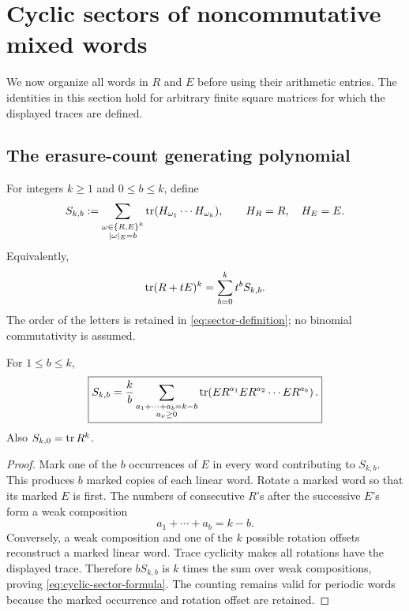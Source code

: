 \section{Cyclic sectors of noncommutative mixed words}
\label{sec:mixed-words}

We now organize all words in \(R\) and \(E\) before using their arithmetic
entries.  The identities in this section hold for arbitrary finite square
matrices for which the displayed traces are defined.

\subsection{The erasure-count generating polynomial}

For integers \(k\ge1\) and \(0\le b\le k\), define
\begin{equation}
 S_{k,b}
 :=
 \sum_{\substack{\omega\in\{R,E\}^k\\|\omega|_E=b}}
 \operatorname{tr}(H_{\omega_1}\cdots H_{\omega_k}),
 \qquad H_R=R,\quad H_E=E.
 \label{eq:sector-definition}
\end{equation}
Equivalently,
\begin{equation}
 \operatorname{tr}(R+tE)^k
 =
 \sum_{b=0}^kt^bS_{k,b}.
 \label{eq:sector-generating-polynomial}
\end{equation}
The order of the letters is retained in
\eqref{eq:sector-definition}; no binomial commutativity is assumed.

\begin{theorem}
\label{thm:cyclic-sector}
For \(1\le b\le k\),
\begin{equation}
 \boxed{
 S_{k,b}
 =
 \frac{k}{b}
 \sum_{\substack{a_1+\cdots+a_b=k-b\\a_\nu\ge0}}
 \operatorname{tr}\!\left(
 E R^{a_1}E R^{a_2}\cdots E R^{a_b}
 \right).}
 \label{eq:cyclic-sector-formula}
\end{equation}
Also \(S_{k,0}=\operatorname{tr} R^k\).
\end{theorem}

\begin{proof}
Mark one of the \(b\) occurrences of \(E\) in every word contributing to
\(S_{k,b}\).  This produces \(b\) marked copies of each linear word.  Rotate
a marked word so that its marked \(E\) is first.  The numbers of consecutive
\(R\)'s after the successive \(E\)'s form a weak composition
\[
 a_1+\cdots+a_b=k-b.
\]
Conversely, a weak composition and one of the \(k\) possible rotation
offsets reconstruct a marked linear word.  Trace cyclicity makes all
rotations have the displayed trace.  Therefore \(bS_{k,b}\) is \(k\)
times the sum over weak compositions, proving
\eqref{eq:cyclic-sector-formula}.  The counting remains valid for periodic
words because the marked occurrence and rotation offset are retained.
\end{proof}

